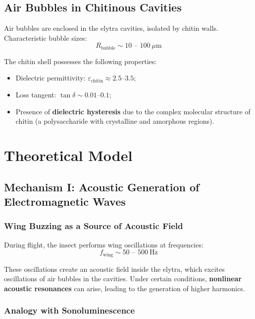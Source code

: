 \documentclass[12pt,a4paper]{article}
\begin{document}
\subsection{Air Bubbles in Chitinous Cavities}

Air bubbles are enclosed in the elytra cavities, isolated by chitin walls. Characteristic bubble sizes:
\begin{equation}
    R_{\text{bubble}} \sim 10 \text{ -- } 100~\mu\text{m}
\end{equation}

The chitin shell possesses the following properties:
\begin{itemize}
    \item Dielectric permittivity: $\varepsilon_{\text{chitin}} \approx 2.5$--$3.5$;
    \item Loss tangent: $\tan \delta \sim 0.01$--$0.1$;
    \item Presence of \textbf{dielectric hysteresis} due to the complex molecular structure of chitin (a polysaccharide with crystalline and amorphous regions).
\end{itemize}

\section{Theoretical Model}

\subsection{Mechanism I: Acoustic Generation of Electromagnetic Waves}

\subsubsection{Wing Buzzing as a Source of Acoustic Field}

During flight, the insect performs wing oscillations at frequencies:
\begin{equation}
    f_{\text{wing}} \sim 50 \text{ -- } 500~\text{Hz}
\end{equation}

These oscillations create an acoustic field inside the elytra, which excites oscillations of air bubbles in the cavities. Under certain conditions, \textbf{nonlinear acoustic resonances} can arise, leading to the generation of higher harmonics.

\subsubsection{Analogy with Sonoluminescence}
\end{document}
